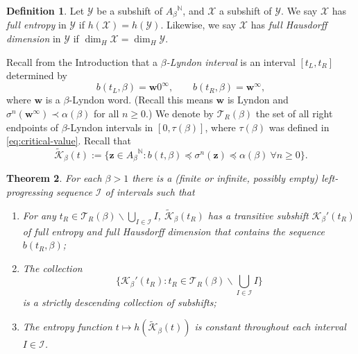 \documentclass[11pt]{amsart}
\newtheorem{theorem}{Theorem}[section]
\theoremstyle{definition}
\newtheorem{definition}[theorem]{Definition}
\theoremstyle{remark}
\numberwithin{equation}{section}
\newcommand{\N}{\ensuremath{\mathbb{N}}}
\newcommand{\II}{\mathcal{I}}
\newcommand{\Kt}{\widetilde{\mathcal{K}}}
\newcommand{\w}{\mathbf{w}}
\newcommand{\z}{\mathbf{z}}
\newcommand{\f}{\infty}
\newcommand{\al}{\alpha}
\newcommand{\lle}{\preccurlyeq}
\newcommand{\si}{\sigma}
\begin{document}
\begin{definition}
Let $\mathcal{Y}$ be a subshift of ${A_\beta}^\N$, and $\mathcal{X}$ a subshift of $\mathcal{Y}$. We say $\mathcal{X}$ has {\em full entropy} in $\mathcal{Y}$ if $h(\mathcal{X})=h(\mathcal{Y})$. Likewise, we say $\mathcal{X}$ has {\em full Hausdorff dimension} in $\mathcal{Y}$ if $\dim_H \mathcal{X}=\dim_H \mathcal{Y}$.
\end{definition}


Recall from the Introduction that a {\em $\beta$-Lyndon interval} is an interval $[t_L,t_R]$ determined by
\[
b(t_L,\beta)=\w 0^\f, \qquad b(t_R,\beta)=\w^\f,
\]
where $\w$ is a $\beta$-Lyndon word. (Recall this means $\w$ is Lyndon and $\si^n(\w^\f)\prec\al(\beta)$ for all $n\geq 0$.)
We denote by $\mathcal{T}_R(\beta)$ the set of all right endpoints of $\beta$-Lyndon intervals in $[0,\tau(\beta)]$, where $\tau(\beta)$ was defined in \eqref{eq:critical-value}. 
{Recall that
\[
\Kt_\beta(t):=\{\z\in{A_\beta}^\N: b(t,\beta)\lle \sigma^n(\z)\lle \alpha(\beta)\ \forall n\geq 0\}.
\]}

\begin{theorem} \label{thm:general-transitivity}
For each $\beta>1$ there is a (finite or infinite, possibly empty) left-progressing sequence $\II$ of intervals such that
\begin{enumerate}[{\rm(i)}]
\item For any $t_R\in\mathcal{T}_R(\beta)\backslash \bigcup_{I\in\II}I$, $\Kt_\beta(t_R)$ has a transitive subshift $\mathcal{K}_\beta'(t_R)$ of full entropy and full Hausdorff dimension that contains the sequence $b(t_R,\beta)$;
\item The collection
\[
\{\mathcal{K}_\beta'(t_R): t_R\in\mathcal{T}_R(\beta)\backslash \textstyle{\bigcup_{I\in\II}I}\}
\]
is a strictly descending collection of subshifts;
\item The entropy function $t\mapsto h(\Kt_\beta(t))$ is constant throughout each interval $I\in\II$.
\end{enumerate}
\end{theorem}
\end{document}
